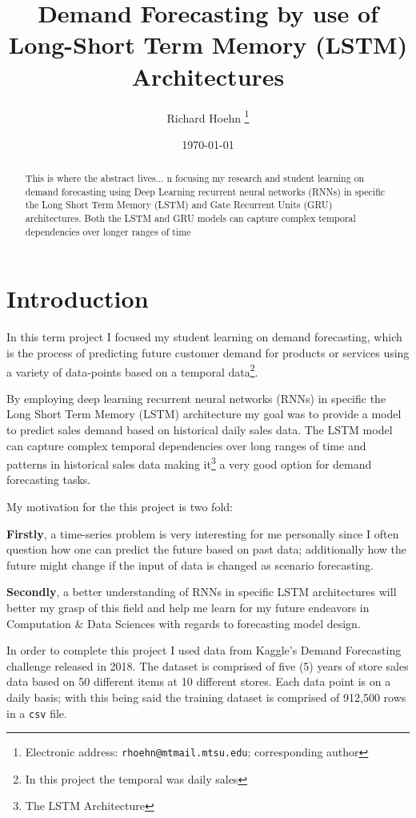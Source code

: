 \documentclass[10pt, journal, letterpaper, compsoc]{IEEEtran}
\title{Demand Forecasting by use of\\Long-Short Term Memory (LSTM) Architectures}
\author{Richard Hoehn%
	\thanks{Electronic address: \texttt{rhoehn@mtmail.mtsu.edu}; corresponding author}}
\affil{Middle Tennessee State University\\ \small CSCI 7850\\ \small Prof. Dr. Joshua L. Phillips}
\date{\today}
\begin{document}
\maketitle

\begin{abstract}
This is where the abstract lives... n focusing my research and student learning on demand forecasting using Deep Learning recurrent neural networks (RNNs) in specific the Long Short Term Memory (LSTM)  and Gate Recurrent Units (GRU) architectures. Both the LSTM and GRU models can capture complex temporal dependencies over longer ranges of time
\end{abstract}


\section{Introduction}
In this term project I focused my student learning on demand forecasting, which is the process of predicting future customer demand for products or services using a variety of data-points based on a temporal data\footnote{In this project the temporal was daily sales}.

By employing deep learning recurrent neural networks (RNNs) in specific the Long Short Term Memory (LSTM) architecture my goal was to provide a model to predict sales demand based on historical daily sales data. The LSTM model can capture complex temporal dependencies over long ranges of time and patterns in historical sales data\cite{pharma-sales-forecast-lstm, predicting-sales-lstm, lstm-gru-performance} making it\footnote{The LSTM Architecture} a very good option for demand forecasting tasks.

My motivation for the this project is two fold:

\textbf{Firstly}, a time-series problem is very interesting for me personally since I often question how one can predict the future based on past data; additionally how the future might change if the input of data is changed as scenario forecasting.

\textbf{Secondly}, a better understanding of RNNs in specific LSTM architectures will better my grasp of this field and help me learn for my future endeavors in Computation \& Data Sciences with regards to forecasting model design.

In order to complete this project I used data from Kaggle's Demand Forecasting challenge\cite{demand-forecasting-kernels-only} released in 2018. The dataset is comprised of five (5) years of store sales data based on 50 different items at 10 different stores. Each data point is on a daily basis; with this being said the training dataset is comprised of 912,500 rows in a \texttt{csv} file. 
\end{document}
